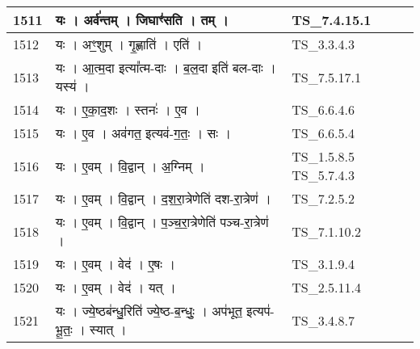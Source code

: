 \documentclass[17pt]{extarticle}
\begin{document}
\begin{longtable}{||p{0.4in}||p{4.9in}||p{0.9in}||}
    \hline
        
    1511 & यः   ।   अर्व॑न्तम्   ।   जिघाꣳ॑सति   ।   तम्   ।    & TS\_7.4.15.1       \\
    
    \hline
        
    1512 & यः   ।   अꣳ॒॒शुम्   ।   गृ॒ह्णाति॑   ।   एति॑   ।    & TS\_3.3.4.3       \\
    
    \hline
        
    1513 & यः   ।   आ॒त्म॒दा इत्या᳚त्म{-}दाः   ।   ब॒ल॒दा इति॑ बल{-}दाः   ।   यस्य॑   ।    & TS\_7.5.17.1       \\
    
    \hline
        
    1514 & यः   ।   ए॒का॒द॒शः   ।   स्तनः॑   ।   ए॒व   ।    & TS\_6.6.4.6       \\
    
    \hline
        
    1515 & यः   ।   ए॒व   ।   अव॑गत॒ इत्यव॑{-}ग॒तः॒   ।   सः   ।    & TS\_6.6.5.4       \\
    
    \hline
        
    1516 & यः   ।   ए॒वम्   ।   वि॒द्वान्   ।   अ॒ग्निम्   ।    & TS\_1.5.8.5 TS\_5.7.4.3       \\
    
    \hline
        
    1517 & यः   ।   ए॒वम्   ।   वि॒द्वान्   ।   द॒श॒रा॒त्रेणेति॑ दश{-}रा॒त्रेण॑   ।    & TS\_7.2.5.2       \\
    
    \hline
        
    1518 & यः   ।   ए॒वम्   ।   वि॒द्वान्   ।   प॒ञ्च॒रा॒त्रेणेति॑ पञ्च{-}रा॒त्रेण॑   ।    & TS\_7.1.10.2       \\
    
    \hline
        
    1519 & यः   ।   ए॒वम्   ।   वेद॑   ।   ए॒षः   ।    & TS\_3.1.9.4       \\
    
    \hline
        
    1520 & यः   ।   ए॒वम्   ।   वेद॑   ।   यत्   ।    & TS\_2.5.11.4       \\
    
    \hline
        
    1521 & यः   ।   ज्ये॒ष्ठब॑न्धु॒रिति॑ ज्ये॒ष्ठ{-}ब॒न्धुः॒   ।   अप॑भूत॒ इत्यप॑{-}भू॒तः॒   ।   स्यात्   ।    & TS\_3.4.8.7       \\
    

\end{longtable}
\end{document}
